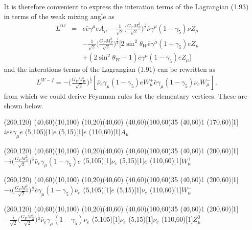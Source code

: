 It is therefore convenient to express the interation terms of the Lagrangian (1.93) in terms of the weak mixing angle as
\begin{eqnarray}
L^\text{0-f}&=&e\bar{e}\gamma^\mu e A_\mu-\frac{1}{\sqrt{2}}\biggl(\frac{G_F M_Z^2}{\sqrt{2}}\biggr)^\frac{1}{2} \bar{\nu}\gamma^\mu(1-\gamma_5)\nu Z_\mu\nonumber\\
&& -\frac{1}{\sqrt{2}}\biggl(\frac{G_F M_Z^2}{\sqrt{2}}\biggr)^\frac{1}{2}[2\sin^2\theta_W\bar{e}\gamma^\mu(1+\gamma_5)eZ_\mu\nonumber\\ &&+(2\sin^2\theta_W-1)\bar{e}\gamma^\mu(1-\gamma_5)eZ_\mu]
\end{eqnarray}
and the interations terms of the Lagrangian (1.91) can be rewritten as
\begin{eqnarray}
L^{W-f}=-\biggl(\frac{G_F M_W^2}{\sqrt{2}} \biggr)^\frac{1}{2}[\bar{\nu}_e\gamma_\mu(1-\gamma_5)eW_\mu^+\bar{e}\gamma_\mu(1-\gamma_5)\nu_e W_\mu^-],
\end{eqnarray}
from which we could derive Feynman rules for the elementary vertices. These are shown below.

\begin{axopicture}(260,120)
	\Line[arrow](40,60)(10,100)
	\Line[arrow](10,20)(40,60)
	\Photon(40,60)(100,60){3}{5}
	\Vertex(40,60){1}
	\Text(170,60)[1]{$i e\bar{e} \gamma_\mu e$}
	\Text(5,105)[1]{$e$}
	\Text(5,15)[1]{$e$}
	\Text(110,60)[1]{$A_\mu$}
\end{axopicture}

\begin{axopicture}(260,120)
	\Line[arrow](40,60)(10,100)
	\Line[arrow](10,20)(40,60)
	\Photon(40,60)(100,60){3}{5}
	\Vertex(40,60){1}
	\Text(200,60)[1]{$-i\big(\frac{G_FM_w^2}{\sqrt{2}}\big)^{\frac{1}{2}}\bar{\nu}_e\gamma_\mu(1-\gamma_5)e$}
	\Text(5,105)[1]{$\nu_e$}
	\Text(5,15)[1]{$e$}
	\Text(110,60)[1]{$W^+_\mu$}
\end{axopicture}


\begin{axopicture}(260,120)
	\Line[arrow](40,60)(10,100)
	\Line[arrow](10,20)(40,60)
	\Photon(40,60)(100,60){3}{5}
	\Vertex(40,60){1}
	\Text(200,60)[1]{$-i\big(\frac{G_FM_w^2}{\sqrt{2}}\big)^{\frac{1}{2}}\bar{e}\gamma_\mu(1-\gamma_5)\nu_e$}
	\Text(5,105)[1]{$e$}
	\Text(5,15)[1]{$\nu_e$}
	\Text(110,60)[1]{$W^-_\mu$}
\end{axopicture}

\begin{axopicture}(260,120)
	\Line[arrow](40,60)(10,100)
	\Line[arrow](10,20)(40,60)
	\Photon(40,60)(100,60){3}{5}
	\Vertex(40,60){1}
	\Text(200,60)[1]{$-\frac{i}{\sqrt{2}}\big(\frac{G_FM_Z^2}{\sqrt{2}}\big)^{\frac{1}{2}}\bar{\nu}_e\gamma_\mu(1-\gamma_5)\nu_e$}
	\Text(5,105)[1]{$\nu_e$}
	\Text(5,15)[1]{$\nu_e$}
	\Text(110,60)[1]{$Z^0_\mu$}
\end{axopicture}


